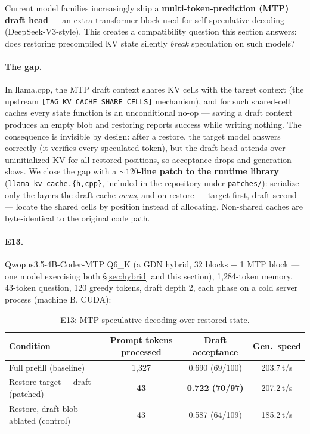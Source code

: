 \documentclass[11pt]{article}
\newcommand{\code}[1]{\texttt{#1}}
\begin{document}
Current model families increasingly ship a \textbf{multi-token-prediction (MTP) draft head} --- an extra transformer block used for self-speculative decoding (DeepSeek-V3-style). This creates a compatibility question this section answers: does restoring precompiled KV state silently \emph{break} speculation on such models?

\paragraph{The gap.}
In llama.cpp, the MTP draft context shares KV cells with the target context (the upstream \code{[TAG\_KV\_CACHE\_SHARE\_CELLS]} mechanism), and for such shared-cell caches every state function is an unconditional no-op --- saving a draft context produces an empty blob and restoring reports success while writing nothing. The consequence is invisible by design: after a restore, the target model answers correctly (it verifies every speculated token), but the draft head attends over uninitialized KV for all restored positions, so acceptance drops and generation slows. We close the gap with a \textbf{${\sim}120$-line patch to the runtime library} (\code{llama-kv-cache.\{h,cpp\}}, included in the repository under \code{patches/}): serialize only the layers the draft cache \emph{owns}, and on restore --- target first, draft second --- locate the shared cells by position instead of allocating. Non-shared caches are byte-identical to the original code path.

\paragraph{E13.}
Qwopus3.5-4B-Coder-MTP Q6\_K (a GDN hybrid, 32 blocks + 1 MTP block --- one model exercising both \S\ref{sec:hybrid} and this section), 1{,}284-token memory, 43-token question, 120 greedy tokens, draft depth 2, each phase on a cold server process (machine B, CUDA):

\begin{table}[h]
  \centering\small
  \caption{E13: MTP speculative decoding over restored state.}
  \begin{tabular}{lccc}
    \toprule
    Condition & Prompt tokens processed & Draft acceptance & Gen.\ speed \\
    \midrule
    Full prefill (baseline) & 1{,}327 & 0.690 (69/100) & 203.7\,t/s \\
    Restore target + draft (patched) & \textbf{43} & \textbf{0.722 (70/97)} & 207.2\,t/s \\
    Restore, draft blob ablated (control) & 43 & 0.587 (64/109) & 185.2\,t/s \\
    \bottomrule
  \end{tabular}
\end{table}
\end{document}
